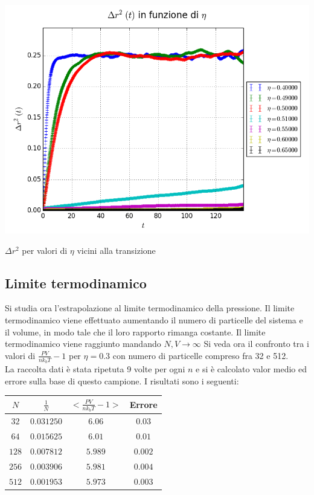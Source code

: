\begin{myfig}[h]
\includegraphics[scale=0.5]{sfere3D/dr2trans.png}
\caption{$\Delta r^2$ per valori di $\eta$ vicini alla transizione}
\end{myfig}

\subsection{Limite termodinamico}
Si studia ora l'estrapolazione al limite termodinamico della pressione. Il limite termodinamico viene effettuato aumentando il numero di particelle del sistema e il volume, in modo tale che il loro rapporto rimanga costante. Il limite termodinamico viene raggiunto mandando $N,V \rightarrow \infty$
Si veda ora il confronto tra i valori di $\frac{P V}{n k_b T} -1$ per $\eta=0.3$ con numero di particelle compreso fra 32 e 512.\\
La raccolta dati è stata ripetuta 9 volte per ogni $n$ e si è calcolato valor medio ed errore sulla base di questo campione. I risultati sono i seguenti:
\begin{center}
	\begin{tabular}{c c c c}
	\toprule
	$N$ & $\frac{1}{N}$ & $<\frac{P V}{n k_b T} -1> $ & Errore \\
	\midrule
	$32	$	& $0.031250$	&$ 6.06	$	& $0.03 $\\
	$64	$	& $0.015625$	&$ 6.01	$	& $0.01 $\\
	$128$	& $0.007812$	&$ 5.989$	& $ 0.002 $\\
	$256$	& $0.003906$	&$ 5.981$	& $ 0.004$ \\
	$512$	& $0.001953$	&$ 5.973$	& $ 0.003$ \\
	\bottomrule
	\end{tabular}
\end{center}


